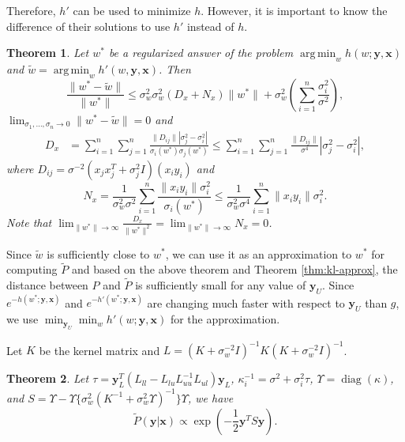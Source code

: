\documentclass[10pt,twocolumn]{IEEEtran}
\newtheorem{theorem}{Theorem}
\DeclareMathOperator*{\argmin}{arg\,min}
\DeclareMathOperator{\diag}{diag}
\begin{document}
	Therefore, $h'$ can be used to minimize $h$. However, it is important to know the difference of their solutions to use $h'$ instead of $h$.
	
	\begin{theorem} \label{thm:w-diff-bound}
		Let $w^*$ be a regularized answer of the problem $\argmin_w h(w; \mathbf{y}, \mathbf{x})$ and $\tilde{w} = \argmin_w h'(w, \mathbf{y}, \mathbf{x})$. Then
		\begin{equation}
			\frac{\|w^* - \tilde{w}\|}{\|w^*\|} \le \sigma_w^2 \sigma_w^2 \left( D_x + N_x \right) \|w^*\| + \sigma_w^2 \left( \sum_{i=1}^n \frac{\sigma_i^2}{\sigma^2} \right),
		\end{equation}
		$\lim_{\sigma_1, \ldots, \sigma_n \to 0} \|w^* - \tilde{w}\| = 0$ and
		\begin{align}
			D_x &= \sum_{i=1}^n \sum_{j=1}^n \frac{\|D_{ij}\| |\sigma_j^2 - \sigma_i^2|}{\sigma_i(w^*) \sigma_j(w^*)} \le \sum_{i=1}^n \sum_{j=1}^n \frac{\|D_{ij}\|}{\sigma^4} |\sigma_j^2 - \sigma_i^2|,
		\end{align}
		where $D_{ij} = \sigma^{-2}(x_j x_j^T + \sigma_j^2 I)(x_i y_i)$ and
		\begin{equation}
			N_x = \frac{1}{\sigma_w^2 \sigma^2} \sum_{i=1}^n \frac{\|x_i y_i\| \sigma_i^2}{\sigma_i(w^*)} \le \frac{1}{\sigma_w^2 \sigma^4} \sum_{i=1}^n \|x_i y_i\| \sigma_i^2.
		\end{equation}
		Note that $\lim_{\|w^*\| \to \infty} \frac{D_x}{\|w^*\|^2} = \lim_{\|w^*\| \to \infty} N_x = 0$.
	\end{theorem}
	
	Since $\tilde{w}$ is sufficiently close to $w^*$, we can use it as an approximation to $w^*$ for computing $\tilde{P}$ and based on the above theorem and Theorem \ref{thm:kl-approx}, the distance between $P$ and $\tilde{P}$ is sufficiently small for any value of $\mathbf{y}_U$. Since $e^{-h(w^*;\mathbf{y},\mathbf{x})}$ and $e^{-h'(w^*;\mathbf{y},\mathbf{x})}$ are changing much faster with respect to $\mathbf{y}_U$ than $g$, we use $\min_{\mathbf{y}_U} \min_w h'(w; \mathbf{y}, \mathbf{x})$ for the approximation.
	
	Let $K$ be the kernel matrix and $L = (K + \sigma_w^{-2} I)^{-1} K (K + \sigma_w^{-2} I)^{-1}$.
	
	\begin{theorem} \label{thm:p-approx}
		Let $\tau = \mathbf{y}_L^T (L_{ll} - L_{lu} L_{uu}^{-1} L_{ul}) \mathbf{y}_L$, $\kappa_i^{-1} = \sigma^2 + \sigma_i^2 \tau$, $\Upsilon = \diag(\kappa)$, and $S = \Upsilon - \Upsilon \{ \sigma_w^2 (K^{-1} + \sigma_w^2 \Upsilon)^{-1} \} \Upsilon$, we have
		\begin{equation}
			\tilde{P}(\mathbf{y}|\mathbf{x}) \propto \exp\left( -\frac12 \mathbf{y}^T S \mathbf{y} \right).
		\end{equation}
	\end{theorem}
	
\end{document}
